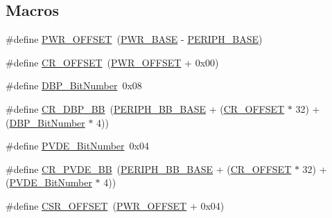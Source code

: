 \subsection*{Macros}
\begin{DoxyCompactItemize}
\item 
\#define \hyperlink{group___p_w_r___private___defines_ga7f88bce73931300319824f22578f90de}{P\+W\+R\+\_\+\+O\+F\+F\+S\+ET}~(\hyperlink{openmotestm_2library_2inc_2stm32f10x__map_8h_ac691ec23dace8b7a649a25acb110217a}{P\+W\+R\+\_\+\+B\+A\+SE} -\/ \hyperlink{openmotestm_2library_2inc_2stm32f10x__map_8h_a9171f49478fa86d932f89e78e73b88b0}{P\+E\+R\+I\+P\+H\+\_\+\+B\+A\+SE})
\item 
\#define \hyperlink{group___p_w_r___private___defines_gafa1d3d0ea72132df651c76fc1bdffffc}{C\+R\+\_\+\+O\+F\+F\+S\+ET}~(\hyperlink{openmotestm_2library_2src_2stm32f10x__pwr_8c_a7f88bce73931300319824f22578f90de}{P\+W\+R\+\_\+\+O\+F\+F\+S\+ET} + 0x00)
\item 
\#define \hyperlink{group___p_w_r___private___defines_ga36ff45d972bf94f31f172fd53cf44d23}{D\+B\+P\+\_\+\+Bit\+Number}~0x08
\item 
\#define \hyperlink{group___p_w_r___private___defines_ga799ab60bdbcfc1076cf2d7f206d09b0c}{C\+R\+\_\+\+D\+B\+P\+\_\+\+BB}~(\hyperlink{openmotestm_2library_2inc_2stm32f10x__map_8h_aed7efc100877000845c236ccdc9e144a}{P\+E\+R\+I\+P\+H\+\_\+\+B\+B\+\_\+\+B\+A\+SE} + (\hyperlink{openmotestm_2library_2src_2stm32f10x__rcc_8c_afa1d3d0ea72132df651c76fc1bdffffc}{C\+R\+\_\+\+O\+F\+F\+S\+ET} $\ast$ 32) + (\hyperlink{openmotestm_2library_2src_2stm32f10x__pwr_8c_a36ff45d972bf94f31f172fd53cf44d23}{D\+B\+P\+\_\+\+Bit\+Number} $\ast$ 4))
\item 
\#define \hyperlink{group___p_w_r___private___defines_ga17d618eb800c401ef9c6789c9374eaf8}{P\+V\+D\+E\+\_\+\+Bit\+Number}~0x04
\item 
\#define \hyperlink{group___p_w_r___private___defines_ga49f51ef8285a6be76fd204d49a00709c}{C\+R\+\_\+\+P\+V\+D\+E\+\_\+\+BB}~(\hyperlink{openmotestm_2library_2inc_2stm32f10x__map_8h_aed7efc100877000845c236ccdc9e144a}{P\+E\+R\+I\+P\+H\+\_\+\+B\+B\+\_\+\+B\+A\+SE} + (\hyperlink{openmotestm_2library_2src_2stm32f10x__rcc_8c_afa1d3d0ea72132df651c76fc1bdffffc}{C\+R\+\_\+\+O\+F\+F\+S\+ET} $\ast$ 32) + (\hyperlink{openmotestm_2library_2src_2stm32f10x__pwr_8c_a17d618eb800c401ef9c6789c9374eaf8}{P\+V\+D\+E\+\_\+\+Bit\+Number} $\ast$ 4))
\item 
\#define \hyperlink{group___p_w_r___private___defines_ga984cbe73312b6d3d355c5053763d499a}{C\+S\+R\+\_\+\+O\+F\+F\+S\+ET}~(\hyperlink{openmotestm_2library_2src_2stm32f10x__pwr_8c_a7f88bce73931300319824f22578f90de}{P\+W\+R\+\_\+\+O\+F\+F\+S\+ET} + 0x04)

\end{DoxyCompactItemize}

